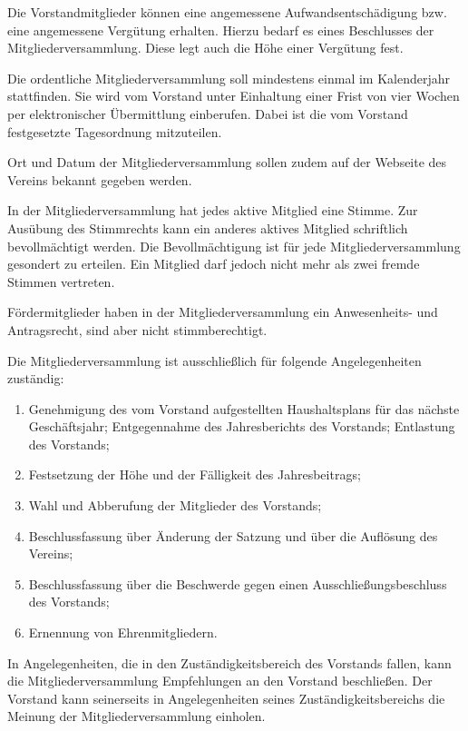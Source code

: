 \documentclass[parskip]{scrartcl}
\begin{document}
\begin{contract}
Die Vorstandmitglieder können eine angemessene Aufwandsentschädigung bzw. eine angemessene Vergütung erhalten. Hierzu bedarf es eines Beschlusses der Mitgliederversammlung. Diese legt auch die Höhe einer Vergütung fest.

\label{einberufung-der-mitgliederversammlung}

Die ordentliche Mitgliederversammlung soll mindestens einmal im Kalenderjahr stattfinden. Sie wird vom Vorstand unter Einhaltung einer Frist von vier Wochen per elektronischer Übermittlung einberufen. Dabei ist die vom Vorstand festgesetzte Tagesordnung mitzuteilen.

Ort und Datum der Mitgliederversammlung sollen zudem auf der Webseite des Vereins bekannt gegeben werden.

\label{mitgliederversammlung}

In der Mitgliederversammlung hat jedes aktive Mitglied eine Stimme. Zur Ausübung des Stimmrechts kann ein anderes aktives Mitglied schriftlich bevollmächtigt werden. Die Bevollmächtigung ist für jede Mitgliederversammlung gesondert zu erteilen. Ein Mitglied darf jedoch nicht mehr als zwei fremde Stimmen vertreten.

Fördermitglieder haben in der Mitgliederversammlung ein Anwesenheits- und Antragsrecht, sind aber nicht stimmberechtigt.

Die Mitgliederversammlung ist ausschließlich für folgende Angelegenheiten zuständig:

\begin{enumerate}
\item Genehmigung des vom Vorstand aufgestellten Haushaltsplans für das nächste Geschäftsjahr; Entgegennahme des Jahresberichts des Vorstands; Entlastung des Vorstands;
\item Festsetzung der Höhe und der Fälligkeit des Jahresbeitrags;
\item Wahl und Abberufung der Mitglieder des Vorstands;
\item Beschlussfassung über Änderung der Satzung und über die Auflösung des Vereins;
\item Beschlussfassung über die Beschwerde gegen einen Ausschließungsbeschluss des Vorstands;
\item Ernennung von Ehrenmitgliedern.
\end{enumerate}

In Angelegenheiten, die in den Zuständigkeitsbereich des Vorstands fallen, kann die Mitgliederversammlung Empfehlungen an den Vorstand beschließen. Der Vorstand kann seinerseits in Angelegenheiten seines Zuständigkeitsbereichs die Meinung der Mitgliederversammlung einholen.


\end{contract}
\end{document}
